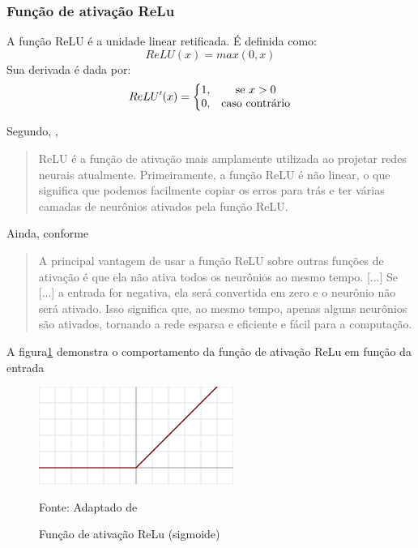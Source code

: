 \subsubsection{Função de ativação ReLu}
A função ReLU é a unidade linear retificada. É definida como: \cite{deep_learning_book_2019}
\begin{equation}\label{relu}
	ReLU(x) = max(0,x)
\end{equation}
Sua derivada é dada por:
\begin{equation}\label{derivada_relu}
	ReLU'(x) = \left \{ \begin{matrix} 1, & \mbox{se }x > 0 \\ 
	0, & \mbox{\textrm{caso contrário}} \end{matrix} \right.
\end{equation}

Segundo, \cite{deep_learning_book_2019},\begin{quote}
	 ReLU é a função de ativação mais amplamente utilizada ao projetar redes neurais atualmente. Primeiramente, a função ReLU é não linear, o que significa que podemos facilmente copiar os erros para trás e ter várias camadas de neurônios ativados pela função ReLU.
\end{quote}

Ainda, conforme \cite{deep_learning_book_2019} \begin{quote}
	A principal vantagem de usar a função ReLU sobre outras funções de ativação é que ela não ativa todos os neurônios ao mesmo tempo. [...] Se [...] a entrada for negativa, ela será convertida em zero e o neurônio não será ativado. Isso significa que, ao mesmo tempo, apenas alguns neurônios são ativados, tornando a rede esparsa e eficiente e fácil para a computação.
\end{quote}

A figura\ref{fig:relu} demonstra o comportamento da função de ativação ReLu em função da entrada

\begin{figure}[h!]
	\centering
	\includegraphics[width=.5\textwidth]{imagens/relu.png}	
	\caption{Função de ativação ReLu (sigmoide)}
	{\scriptsize 	Fonte: Adaptado de \cite{haykin_redes_2001}}
	\label{fig:relu}
\end{figure}

